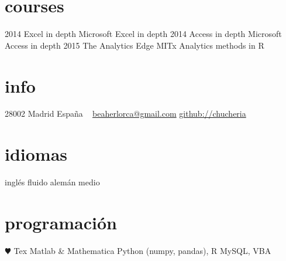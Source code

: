 \documentclass[]{friggeri-cv}
\begin{document}
\section{courses}

\begin{entrylist}
  \entry
    {2014}
    {Excel in depth}
    {}
    {Microsoft Excel in depth}
  \entry
    {2014}
    {Access in depth}
    {}
    {Microsoft Access in depth}
  \entry
    {2015}
    {The Analytics Edge}
    {MITx}
    {Analytics methods in R}
\end{entrylist}




\else 

       {}


\begin{aside}
  \section{info}
    28002 Madrid
    España
    ~
    \href{mailto:beaherlorca@gmail.com}{beaherlorca@gmail.com}
    \href{https://github.com/chucheria}{github://chucheria}
  \section{idiomas}
    inglés fluido
    alemán medio
  \section{programación}
    {\color{red} $\varheartsuit$} Tex
    Matlab \& Mathematica
    Python (numpy, pandas), R
    MySQL, VBA
\end{aside}
\end{document}
